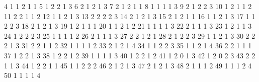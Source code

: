\documentclass[
  letterpaper,
  DIV=11,
  numbers=noendperiod]{scrreprt}
\newenvironment{Shaded}{\begin{snugshade}}{\end{snugshade}}
\newcommand{\NormalTok}[1]{\textcolor[rgb]{0.00,0.23,0.31}{#1}}
\begin{document}
\begin{Shaded}
\begin{Highlighting}[]
\NormalTok{4           1         1     2    1        1}
\NormalTok{5           1         2     2    1        3}
\NormalTok{6           2         1     2    1        3}
\NormalTok{7           2         1     2    1        1}
\NormalTok{8           1         1     1    1        3}
\NormalTok{9           2         1     2    2        3}
\NormalTok{10          1         2     1    1        2}
\NormalTok{11          2         2     1    1        2}
\NormalTok{12          1         1     2    1        3}
\NormalTok{13          2         2     2    2        3}
\NormalTok{14          2         1     2    1        3}
\NormalTok{15          2         1     2    1        1}
\NormalTok{16          1         1     2    1        3}
\NormalTok{17          1         1     2    2        3}
\NormalTok{18          2         1     2    1        3}
\NormalTok{19          1         2     1    1        1}
\NormalTok{20          1         1     2    1        2}
\NormalTok{21          1         1     1    1        3}
\NormalTok{22          2         1     1    1        3}
\NormalTok{23          1         2     1    1        3}
\NormalTok{24          1         2     2    2        3}
\NormalTok{25          1         1     1    1        2}
\NormalTok{26          2         1     1    1        3}
\NormalTok{27          2         2     1    2        1}
\NormalTok{28          2         1     2    2        3}
\NormalTok{29          1         1     2    1        3}
\NormalTok{30          2         2     2    1        3}
\NormalTok{31          2         2     1    1        2}
\NormalTok{32          1         1     1    1        2}
\NormalTok{33          2         1     2    1        4}
\NormalTok{34          1         1     2    2        3}
\NormalTok{35          1         1     2    1        4}
\NormalTok{36          2         2     1    1        1}
\NormalTok{37          1         2     2    1        3}
\NormalTok{38          1         2     2    1        2}
\NormalTok{39          1         1     1    1        3}
\NormalTok{40          1         2     2    1        2}
\NormalTok{41          1         2     0    1        3}
\NormalTok{42          1         2     0    2        3}
\NormalTok{43          2         2     1    1        3}
\NormalTok{44          1         2     2    1        1}
\NormalTok{45          1         1     2    2        2}
\NormalTok{46          2         1     2    1        3}
\NormalTok{47          2         1     2    1        3}
\NormalTok{48          2         1     1    1        2}
\NormalTok{49          1         1     1    2        4}
\NormalTok{50          1         1     1    1        4}

\end{Highlighting}
\end{Shaded}
\end{document}
